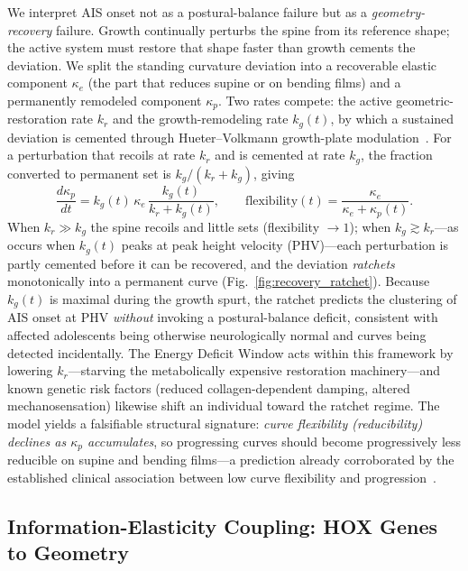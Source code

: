 We interpret AIS onset not as a postural-balance failure but as a \emph{geometry-recovery} failure. Growth continually perturbs the spine from its reference shape; the active system must restore that shape faster than growth cements the deviation. We split the standing curvature deviation into a recoverable elastic component $\kappa_e$ (the part that reduces supine or on bending films) and a permanently remodeled component $\kappa_p$. Two rates compete: the active geometric-restoration rate $k_r$ and the growth-remodeling rate $k_g(t)$, by which a sustained deviation is cemented through Hueter--Volkmann growth-plate modulation~\cite{stokes1996mechanical, stokes2007growth, villemure2009growth}. For a perturbation that recoils at rate $k_r$ and is cemented at rate $k_g$, the fraction converted to permanent set is $k_g/(k_r+k_g)$, giving
\begin{equation}
\frac{d\kappa_p}{dt} = k_g(t)\,\kappa_e\,\frac{k_g(t)}{k_r + k_g(t)}, \qquad \mathrm{flexibility}(t) = \frac{\kappa_e}{\kappa_e + \kappa_p(t)}.
\label{eq:recovery_ratchet}
\end{equation}
When $k_r \gg k_g$ the spine recoils and little sets (flexibility $\to 1$); when $k_g \gtrsim k_r$---as occurs when $k_g(t)$ peaks at peak height velocity (PHV)---each perturbation is partly cemented before it can be recovered, and the deviation \emph{ratchets} monotonically into a permanent curve (Fig.~\ref{fig:recovery_ratchet}). Because $k_g(t)$ is maximal during the growth spurt, the ratchet predicts the clustering of AIS onset at PHV \emph{without} invoking a postural-balance deficit, consistent with affected adolescents being otherwise neurologically normal and curves being detected incidentally. The Energy Deficit Window acts within this framework by lowering $k_r$---starving the metabolically expensive restoration machinery---and known genetic risk factors (reduced collagen-dependent damping, altered mechanosensation) likewise shift an individual toward the ratchet regime. The model yields a falsifiable structural signature: \emph{curve flexibility (reducibility) declines as $\kappa_p$ accumulates}, so progressing curves should become progressively less reducible on supine and bending films---a prediction already corroborated by the established clinical association between low curve flexibility and progression~\cite{cheung2020supine, ohrtnissen2016flexibility, alfraihat2022random}.

\subsection{Information-Elasticity Coupling: HOX Genes to Geometry}


